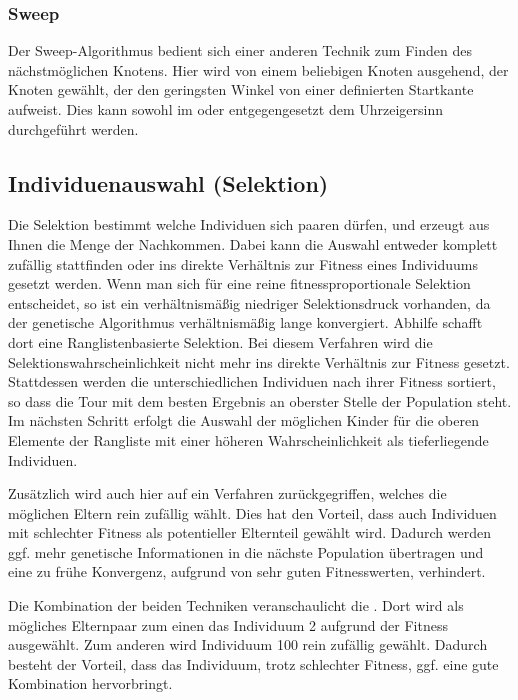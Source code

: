 \subsubsection{Sweep}
Der Sweep-Algorithmus bedient sich einer anderen Technik zum Finden des nächstmöglichen Knotens. Hier wird von einem beliebigen Knoten ausgehend, der Knoten gewählt, der den geringsten Winkel von einer definierten Startkante aufweist. Dies kann sowohl im oder entgegengesetzt dem Uhrzeigersinn durchgeführt werden.

\subsection{Individuenauswahl (Selektion)}
\label{sec:Selektion}
Die Selektion bestimmt welche Individuen sich paaren dürfen, und erzeugt aus Ihnen die Menge der Nachkommen. Dabei kann die Auswahl entweder komplett zufällig stattfinden oder ins direkte Verhältnis zur Fitness eines Individuums gesetzt werden. Wenn man sich für eine reine fitnessproportionale Selektion entscheidet, so ist ein verhältnismäßig niedriger Selektionsdruck vorhanden, da der genetische Algorithmus verhältnismäßig lange konvergiert. Abhilfe schafft dort eine Ranglistenbasierte Selektion. Bei diesem Verfahren wird die Selektionswahrscheinlichkeit nicht mehr ins direkte Verhältnis zur Fitness gesetzt. Stattdessen werden die unterschiedlichen Individuen nach ihrer Fitness sortiert, so dass die Tour mit dem besten Ergebnis an oberster Stelle der Population steht. Im nächsten Schritt erfolgt die Auswahl der möglichen Kinder für die oberen Elemente der Rangliste mit einer höheren Wahrscheinlichkeit als tieferliegende Individuen. 

Zusätzlich wird auch hier auf ein Verfahren zurückgegriffen, welches die möglichen Eltern rein zufällig wählt. Dies hat den Vorteil, dass auch Individuen mit schlechter Fitness als potentieller Elternteil gewählt wird. Dadurch werden ggf. mehr genetische Informationen in die nächste Population übertragen und eine zu frühe Konvergenz, aufgrund von sehr guten Fitnesswerten, verhindert. 

Die Kombination der beiden Techniken veranschaulicht die . Dort wird als mögliches Elternpaar zum einen das Individuum 2 aufgrund der Fitness ausgewählt. Zum anderen wird Individuum 100 rein zufällig gewählt. Dadurch besteht der Vorteil, dass das Individuum, trotz schlechter Fitness, ggf. eine gute Kombination hervorbringt.


